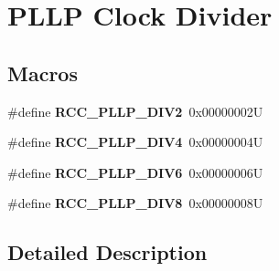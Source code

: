 \hypertarget{group___r_c_c___p_l_l_p___clock___divider}{}\section{P\+L\+LP Clock Divider}
\label{group___r_c_c___p_l_l_p___clock___divider}
\subsection*{Macros}
\begin{DoxyCompactItemize}
\item 
\mbox{\label{group___r_c_c___p_l_l_p___clock___divider_ga16248cbd581f020b8a8d1cf0d9f0864d}} 
\#define {\bfseries R\+C\+C\+\_\+\+P\+L\+L\+P\+\_\+\+D\+I\+V2}~0x00000002U
\item 
\mbox{\label{group___r_c_c___p_l_l_p___clock___divider_ga91b2c03c1f205addc5f52a1e740f801a}} 
\#define {\bfseries R\+C\+C\+\_\+\+P\+L\+L\+P\+\_\+\+D\+I\+V4}~0x00000004U
\item 
\mbox{\label{group___r_c_c___p_l_l_p___clock___divider_ga5ad6be8ec0a6efaa1c81fbd29017a1fa}} 
\#define {\bfseries R\+C\+C\+\_\+\+P\+L\+L\+P\+\_\+\+D\+I\+V6}~0x00000006U
\item 
\mbox{\label{group___r_c_c___p_l_l_p___clock___divider_gaab7662734bfff248c5dad97ea5f6736e}} 
\#define {\bfseries R\+C\+C\+\_\+\+P\+L\+L\+P\+\_\+\+D\+I\+V8}~0x00000008U
\end{DoxyCompactItemize}


\subsection{Detailed Description}
